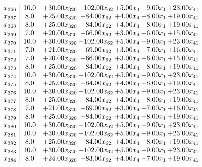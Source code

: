 \documentclass[8pt]{article}
\begin{document}
\[\begin{array}{c| c c@{\hskip 2pt} c@{\hskip 2pt} c@{\hskip 2pt} c@{\hskip 2pt} c@{\hskip 2pt} }
 x_{366}   &  10.0 & + 30.00 x_{320} & -102.00 x_{62} & +  5.00 x_{4} & -9.00 x_{1} & + 23.00 x_{41}\\
 x_{367}   &  8.0 & + 25.00 x_{320} & -84.00 x_{62} & +  4.00 x_{4} & -8.00 x_{1} & + 19.00 x_{41}\\
 x_{368}   &  8.0 & + 25.00 x_{320} & -84.00 x_{62} & +  4.00 x_{4} & -8.00 x_{1} & + 19.00 x_{41}\\
 x_{369}   &  7.0 & + 20.00 x_{320} & -66.00 x_{62} & +  3.00 x_{4} & -6.00 x_{1} & + 15.00 x_{41}\\
 x_{370}   &  10.0 & + 30.00 x_{320} & -102.00 x_{62} & +  5.00 x_{4} & -9.00 x_{1} & + 23.00 x_{41}\\
 x_{371}   &  7.0 & + 21.00 x_{320} & -69.00 x_{62} & +  3.00 x_{4} & -7.00 x_{1} & + 16.00 x_{41}\\
 x_{372}   &  7.0 & + 20.00 x_{320} & -66.00 x_{62} & +  3.00 x_{4} & -6.00 x_{1} & + 15.00 x_{41}\\
 x_{373}   &  8.0 & + 25.00 x_{320} & -84.00 x_{62} & +  4.00 x_{4} & -8.00 x_{1} & + 19.00 x_{41}\\
 x_{374}   &  10.0 & + 30.00 x_{320} & -102.00 x_{62} & +  5.00 x_{4} & -9.00 x_{1} & + 23.00 x_{41}\\
 x_{375}   &  8.0 & + 25.00 x_{320} & -84.00 x_{62} & +  4.00 x_{4} & -8.00 x_{1} & + 19.00 x_{41}\\
 x_{376}   &  10.0 & + 30.00 x_{320} & -102.00 x_{62} & +  5.00 x_{4} & -9.00 x_{1} & + 23.00 x_{41}\\
 x_{377}   &  8.0 & + 25.00 x_{320} & -84.00 x_{62} & +  4.00 x_{4} & -8.00 x_{1} & + 19.00 x_{41}\\
 x_{378}   &  7.0 & + 21.00 x_{320} & -69.00 x_{62} & +  3.00 x_{4} & -7.00 x_{1} & + 16.00 x_{41}\\
 x_{379}   &  8.0 & + 25.00 x_{320} & -84.00 x_{62} & +  4.00 x_{4} & -8.00 x_{1} & + 19.00 x_{41}\\
 x_{380}   &  10.0 & + 30.00 x_{320} & -102.00 x_{62} & +  5.00 x_{4} & -9.00 x_{1} & + 23.00 x_{41}\\
 x_{381}   &  10.0 & + 30.00 x_{320} & -102.00 x_{62} & +  5.00 x_{4} & -9.00 x_{1} & + 23.00 x_{41}\\
 x_{382}   &  8.0 & + 25.00 x_{320} & -84.00 x_{62} & +  4.00 x_{4} & -8.00 x_{1} & + 19.00 x_{41}\\
 x_{383}   &  10.0 & + 30.00 x_{320} & -102.00 x_{62} & +  5.00 x_{4} & -9.00 x_{1} & + 23.00 x_{41}\\
 x_{384}   &  8.0 & + 24.00 x_{320} & -83.00 x_{62} & +  4.00 x_{4} & -7.00 x_{1} & + 19.00 x_{41}\\

\end{array}\]
\end{document}
